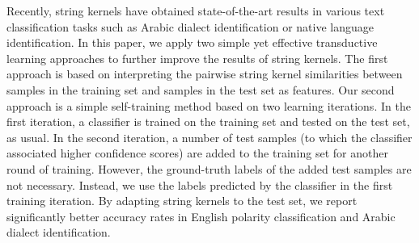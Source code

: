 Recently, string kernels have obtained state-of-the-art results in various text classification tasks such as Arabic dialect identification or native language identification. In this paper, we apply two simple yet effective transductive learning approaches to further improve the results of string kernels. The first approach is based on interpreting the pairwise string kernel similarities between samples in the training set and samples in the test set as features. Our second approach is a simple self-training method based on two learning iterations. In the first iteration, a classifier is trained on the training set and tested on the test set, as usual. In the second iteration, a number of test samples (to which the classifier associated higher confidence scores) are added to the training set for another round of training. However, the ground-truth labels of the added test samples are not necessary. Instead, we use the labels predicted by the classifier in the first training iteration. By adapting string kernels to the test set, we report significantly better accuracy rates in English polarity classification and Arabic dialect identification.
